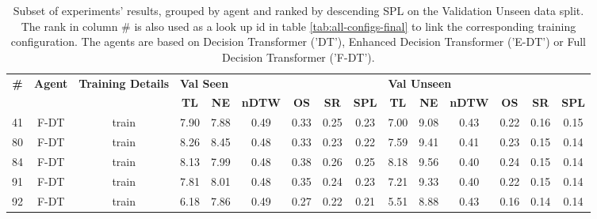 \begin{table}
\centering
\caption{\label{tab:full_dt_ablation}Subset of experiments' results, grouped by agent and ranked by descending SPL on the Validation Unseen data split. The rank in column \# is also used as a look up id in table \ref{tab:all-configs-final} to link the corresponding training configuration.     \newline The agents are based on Decision Transformer ('DT'), Enhanced Decision Transformer ('E-DT') or Full Decision Transformer ('F-DT').}
\begin{tabular}{@{\hskip3pt}c@{\hskip3pt}c@{\hskip3pt}c@{\hskip3pt}c@{\hskip3pt}c@{\hskip3pt}c@{\hskip3pt}c@{\hskip3pt}c@{\hskip3pt}c@{\hskip3pt}c@{\hskip3pt}c@{\hskip3pt}c@{\hskip3pt}c@{\hskip3pt}c@{\hskip3pt}c}
\toprule
\textbf{\#} & \textbf{Agent} & \textbf{Training Details} & \multicolumn{6}{l}{\textbf{Val Seen}} & \multicolumn{6}{l}{\textbf{Val Unseen}} \\
 \textbf{~} &     \textbf{~} &                \textbf{~} &       \textbf{TL} & \textbf{NE} & \textbf{nDTW} & \textbf{OS} & \textbf{SR} & \textbf{SPL} &         \textbf{TL} & \textbf{NE} & \textbf{nDTW} & \textbf{OS} & \textbf{SR} & \textbf{SPL} \\
\midrule
         41 &           F-DT &                     train &              7.90 &        7.88 &          0.49 &        0.33 &        0.25 &         0.23 &                7.00 &        9.08 &          0.43 &        0.22 &        0.16 &         0.15 \\
         80 &           F-DT &                     train &              8.26 &        8.45 &          0.48 &        0.33 &        0.23 &         0.22 &                7.59 &        9.41 &          0.41 &        0.23 &        0.15 &         0.14 \\
         84 &           F-DT &                     train &              8.13 &        7.99 &          0.48 &        0.38 &        0.26 &         0.25 &                8.18 &        9.56 &          0.40 &        0.24 &        0.15 &         0.14 \\
         91 &           F-DT &                     train &              7.81 &        8.01 &          0.48 &        0.35 &        0.24 &         0.23 &                7.21 &        9.33 &          0.40 &        0.22 &        0.15 &         0.14 \\
         92 &           F-DT &                     train &              6.18 &        7.86 &          0.49 &        0.27 &        0.22 &         0.21 &                5.51 &        8.88 &          0.43 &        0.16 &        0.14 &         0.14 \\

\end{tabular}
\end{table}
